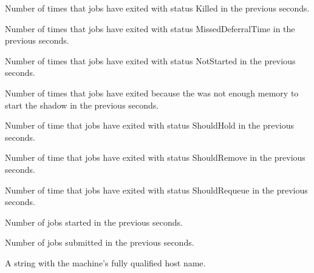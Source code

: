 \begin{description}
\item[\AdAttr{JobsKilled}:] Number of times that jobs have exited with status Killed
  in the previous  seconds.

\item[\AdAttr{JobsMissedDeferralTime}:] Number of times that jobs have exited with status MissedDeferralTime
  in the previous  seconds.

\item[\AdAttr{JobsNotStarted}:] Number of times that jobs have exited with status NotStarted
  in the previous  seconds.

\item[\AdAttr{JobsShadowNoMemory}:] Number of times that jobs have exited because the was not enough memory to start the shadow
  in the previous  seconds.

\item[\AdAttr{JobsShouldHold}:] Number of time that jobs have exited with status ShouldHold
  in the previous  seconds.

\item[\AdAttr{JobsShouldRemove}:] Number of time that jobs have exited with status ShouldRemove
  in the previous  seconds.

\item[\AdAttr{JobsShouldRequeue}:] Number of time that jobs have exited with status ShouldRequeue
  in the previous  seconds.

\item[\AdAttr{JobsStarted}:] Number of jobs started
  in the previous  seconds.

\item[\AdAttr{JobsSubmitted}:] Number of jobs submitted
  in the previous  seconds.

\item[\AdAttr{Machine}:] A string with the machine's fully qualified 
  host name.


\end{description}
